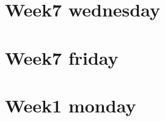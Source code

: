 
\section*{Week7 wednesday}

\vfill
\section*{Week7 friday}

\vfill
\section*{Week1 monday}

\vfill
